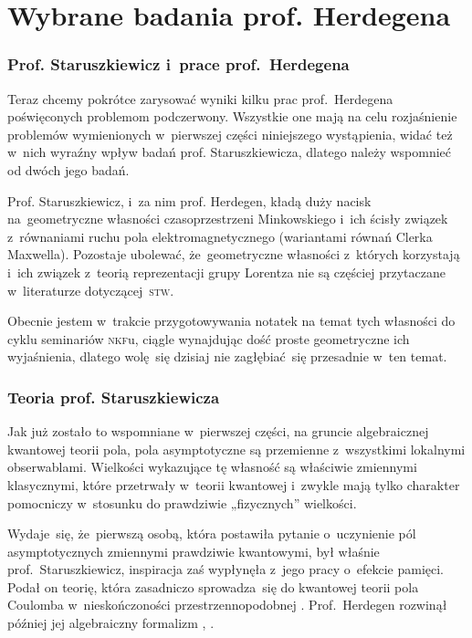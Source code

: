 \documentclass[10pt,t]{beamer}
\begin{document}
\section{Wybrane badania prof. Herdegena}


\begin{frame}
  \frametitle{Prof. Staruszkiewicz i~prace
    prof.~Herdegena}


  Teraz chcemy pokrótce zarysować wyniki kilku prac prof.~Herdegena
  poświęconych problemom podczerwony. Wszystkie one mają na celu
  rozjaśnienie problemów wymienionych w~pierwszej części niniejszego
  wystąpienia, widać też w~nich wyraźny wpływ badań prof. Staruszkiewicza,
  dlatego należy wspomnieć od dwóch jego badań.

  Prof. Staruszkiewicz, i~za nim prof. Herdegen, kładą duży nacisk
  na~geometryczne własności czasoprzestrzeni Minkowskiego i~ich ścisły
  związek z~równaniami ruchu pola elektromagnetycznego (wariantami równań
  Clerka Maxwella). Pozostaje ubolewać, że~geometryczne własności z~których
  korzystają i~ich związek z~teorią reprezentacji grupy Lorentza nie są
  częściej przytaczane w~literaturze dotyczącej~\textsc{stw}.

  Obecnie jestem w~trakcie przygotowywania notatek na temat tych własności
  do cyklu seminariów \textsc{nkf}u, ciągle wynajdując dość proste
  geometryczne ich wyjaśnienia, dlatego wolę~się dzisiaj nie zagłębiać~się
  przesadnie w~ten temat.

\end{frame}





\begin{frame}
  \frametitle{Teoria prof. Staruszkiewicza}


  Jak już zostało to wspomniane w~pierwszej części, na gruncie algebraicznej
  kwantowej teorii pola, pola asymptotyczne są przemienne z~wszystkimi
  lokalnymi obserwablami. Wielkości wykazujące tę własność są
  właściwie zmiennymi klasycznymi, które przetrwały w~teorii kwantowej
  i~zwykle mają tylko charakter pomocniczy w~stosunku do prawdziwie
  „fizycznych” wielkości.

  Wydaje~się, że~pierwszą osobą, która postawiła pytanie o~uczynienie pól
  asymptotycznych zmiennymi prawdziwie kwantowymi, był właśnie
  prof.~Staruszkiewicz, inspiracja zaś wypłynęła z~jego pracy o~efekcie
  pamięci. Podał on teorię, która zasadniczo sprowadza~się do kwantowej
  teorii pola Coulomba w~nieskończoności przestrzennopodobnej
  \parencite{Staruszkiewicz-Quantum-Mechanics-of-Phase-and-Charge-ETC-Pub-1989}.
  Prof.~Herdegen rozwinął później jej algebraiczny formalizm
  \parencite{Herdegen-Asymptotic-algebra-of-quantum-electrodynamics-Pub-2005},
  \parencite{Herdegen-Remarks-on-mathematical-structure-of-ETC-Pub-2022} .

\end{frame}
\end{document}
